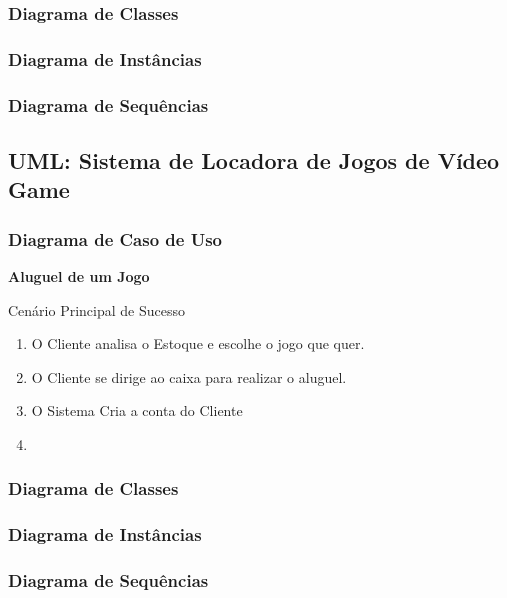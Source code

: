 \documentclass[a4paper,10pt]{article}
\begin{document}
\subsubsection{Diagrama de Classes}
\subsubsection{Diagrama de Instâncias}
\subsubsection{Diagrama de Sequências}

\subsection{UML: Sistema de Locadora de Jogos de Vídeo Game}

\subsubsection{Diagrama de Caso de Uso}

\textbf{Aluguel de um Jogo}

Cenário Principal de Sucesso

\begin{enumerate}
	\item O Cliente analisa o Estoque e escolhe o jogo que quer.
	\item O Cliente se dirige ao caixa para realizar o aluguel.
	\item O Sistema Cria a conta do Cliente
	\item 
\end{enumerate}

\subsubsection{Diagrama de Classes}
\subsubsection{Diagrama de Instâncias}
\subsubsection{Diagrama de Sequências}



 
\end{document}
